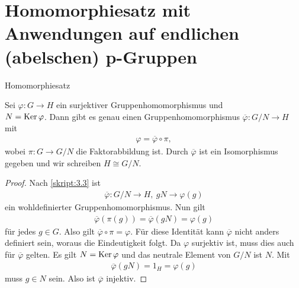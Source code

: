 \section{Homomorphiesatz mit Anwendungen auf endlichen (abelschen) p-Gruppen}

\begin{genericthm}{Homomorphiesatz}\label{skript:5.1} 

Sei $ \varphi : G \to H$ ein surjektiver Gruppenhomomorphismus und \\
$N= \operatorname{Ker} \varphi$.
Dann gibt es genau einen Gruppenhomomorphismus $\overline{\varphi}: G/N \rightarrow H$ mit
\begin{align*}
\varphi = \overline{ \varphi  } \circ \pi,
\end{align*}
wobei $  \pi : G \to G/N$ die Faktorabbildung ist. 
Durch $\overline{\varphi }$ ist ein Isomorphismus gegeben und wir schreiben $H \cong G/N$. 
\end{genericthm}

\begin{proof}
	Nach \ref{skript:3.3} ist
	\begin{align*}
	\overline{\varphi} : G/N \to H, \ gN \to \varphi(g)
	\end{align*}
	ein wohldefinierter Gruppenhomomorphismus.
	Nun gilt
	\begin{align*}
	\overline{\varphi}(\pi(g)) = \overline{\varphi}(gN) = \varphi(g)
	\end{align*}
	für jedes $ g \in G $. Also gilt $ \overline{\varphi} \circ \pi = \varphi $.
	Für diese Identität kann $ \overline{\varphi} $  nicht anders definiert sein, woraus die Eindeutigkeit folgt. 
	Da $ \varphi $ surjektiv ist, muss dies auch für $ \overline{\varphi} $ gelten.
	Es gilt $ N = \operatorname{Ker} \varphi $ und das neutrale Element von $ G/N $ ist $ N $.
	Mit  
	\begin{align*}
	\overline{\varphi}(gN) = 1_H = \varphi(g)
	\end{align*}
	muss $ g \in N $ sein. Also ist $ \overline{\varphi} $ injektiv.
\end{proof}

